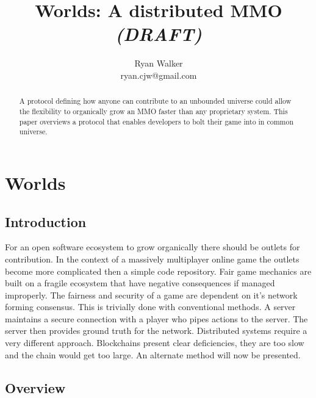 \documentclass[runningheads,a4paper]{llncs}
\begin{document}
\def \SystemName {Worlds} %

\mainmatter  %

\title{\SystemName: A distributed MMO \textit{(DRAFT)}}

\author{Ryan Walker\\
				ryan.cjw@gmail.com}

\institute{} %

\maketitle

\begin{abstract}
A protocol defining how anyone can contribute to an unbounded universe could allow the flexibility to organically grow an MMO faster than any proprietary system. This paper overviews a protocol that enables developers to bolt their game into in common universe. 
\end{abstract}

\section{Worlds}
\subsection{Introduction}
For an open software ecosystem to grow organically there should be outlets for contribution. In the context of a massively multiplayer online game the outlets become more complicated then a simple code repository. Fair game mechanics are built on a fragile ecosystem that have negative consequences if managed improperly. The fairness and security of a game are dependent on it's network forming consensus. This is trivially done with conventional methods. A server maintains a secure connection with a player who pipes actions to the server. The server then provides ground truth for the network. Distributed systems require a very different approach. Blockchains present clear deficiencies, they are too slow and the chain would get too large. An alternate method will now be presented.

\subsection{Overview}
\end{document}
